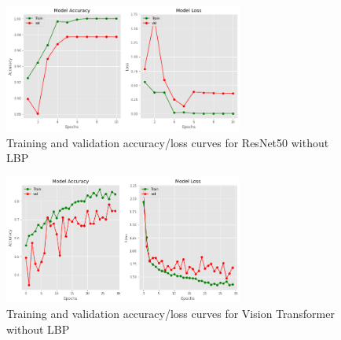 \documentclass{ijclclp}
\begin{document}
\begin{figure}[htbp]
    \centering
    \includegraphics[width=0.70\textwidth]{image10.png}
    \caption{Training and validation accuracy/loss curves for ResNet50 without LBP}
    \label{fig:resnet50_no_lbp}
\end{figure}

\begin{figure}[htbp]
    \centering
    \includegraphics[width=0.70\textwidth]{image11.png}
    \caption{Training and validation accuracy/loss curves for Vision Transformer without LBP}
    \label{fig:vit_no_lbp}
\end{figure}
\end{document}
